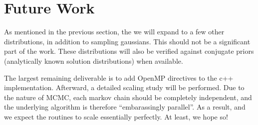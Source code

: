 \documentclass{article}
\begin{document}
\section{Future Work}

As mentioned in the previous section, the we will expand to a few other distributions, in addition to 
sampling gaussians. This should not be a significant part of the work. These distributions will also be 
verified against conjugate priors (analytically known solution distributions) when available. 

The largest remaining deliverable is to add OpenMP directives to the c++
implementation. Afterward, a detailed scaling study will be
performed. Due to the nature of MCMC, each markov chain should be
completely independent, and the underlying algorithm is therefore
``embarassingly parallel''. As a result, and we expect the routines to
scale essentially perfectly. At least, we hope so!
\end{document}
